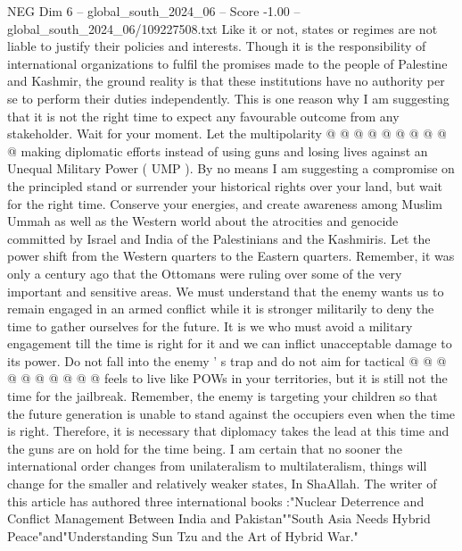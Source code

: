 \begin{textsample}{NEG Dim 6 – global\_south\_2024\_06 – Score -1.00 – global\_south\_2024\_06/109227508.txt}
Like it or not, states or regimes are not liable to justify their policies and interests.
Though it is the responsibility of international organizations to fulfil the promises made to the people of Palestine and Kashmir, the ground reality is that these institutions have no authority per se to perform their duties independently.
This is one reason why I am suggesting that it is not the right time to expect any favourable outcome from any stakeholder.
Wait for your moment.
Let the multipolarity @ @ @ @ @ @ @ @ @ @ making diplomatic efforts instead of using guns and losing lives against an Unequal Military Power ( UMP ).
By no means I am suggesting a compromise on the principled stand or surrender your historical rights over your land, but wait for the right time.
Conserve your energies, and create awareness among Muslim Ummah as well as the Western world about the atrocities and genocide committed by Israel and India of the Palestinians and the Kashmiris.
Let the power shift from the Western quarters to the Eastern quarters.
Remember, it was only a century ago that the Ottomans were ruling over some of the very important and sensitive areas.
We must understand that the enemy wants us to remain engaged in an armed conflict while it is stronger militarily to deny the time to gather ourselves for the future.
It is we who must avoid a military engagement till the time is right for it and we can inflict unacceptable damage to its power.
Do not fall into the enemy ' s trap and do not aim for tactical @ @ @ @ @ @ @ @ @ @ feels to live like POWs in your territories, but it is still not the time for the jailbreak.
Remember, the enemy is targeting your children so that the future generation is unable to stand against the occupiers even when the time is right.
Therefore, it is necessary that diplomacy takes the lead at this time and the guns are on hold for the time being.
I am certain that no sooner the international order changes from unilateralism to multilateralism, things will change for the smaller and relatively weaker states, In ShaAllah.
The writer of this article has authored three international books :"Nuclear Deterrence and Conflict Management Between India and Pakistan""South Asia Needs Hybrid Peace"and"Understanding Sun Tzu and the Art of Hybrid War."

\end{textsample}
